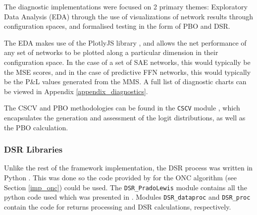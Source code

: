 \documentclass[a4paper,11pt,oneside]{article}
\theoremstyle{plain}
\theoremstyle{definition}
\begin{document}
	The diagnostic implementations were focused on 2 primary themes: Exploratory Data Analysis (EDA) through the use of visualizations of network results through configuration spaces, and formalised testing in the form of PBO and DSR.\newline
	
	The EDA makes use of the PlotlyJS library \citep{PlotlyJS}, and allows the net performance of any set of networks to be plotted along a particular dimension in their configuration space. In the case of a set of SAE networks, this would typically be the MSE scores, and in the case of predictive FFN networks, this would typically be the P\&L values generated from the MMS. A full list of diagnostic charts can be viewed in Appendix \ref{appendix_diagnostics}. \newline
	
	The CSCV and PBO methodologies can be found in the \texttt{CSCV} module \citep{DCCSCV}, which encapsulates the generation and assessment of the logit distributions, as well as the PBO calculation.
	
	\subsubsection{DSR Libraries}
	
	Unlike the rest of the framework implementation, the DSR process was written in Python \citep{Python}. This was done so the code provided by \citet{PradoDSR} for the ONC algorithm (see Section \ref{imp_onc}) could be used. The \texttt{DSR\_PradoLewis} module \citep{DCDSR_PradoLewis} contains all the python code used which was presented in \citep{PradoDSR}. Modules \texttt{DSR\_dataproc} \citep{DCDSR_Dataproc} and \texttt{DSR\_proc} \citep{DCDSR_proc} contain the code for returns processing and DSR calculations, respectively.
	
\end{document}
